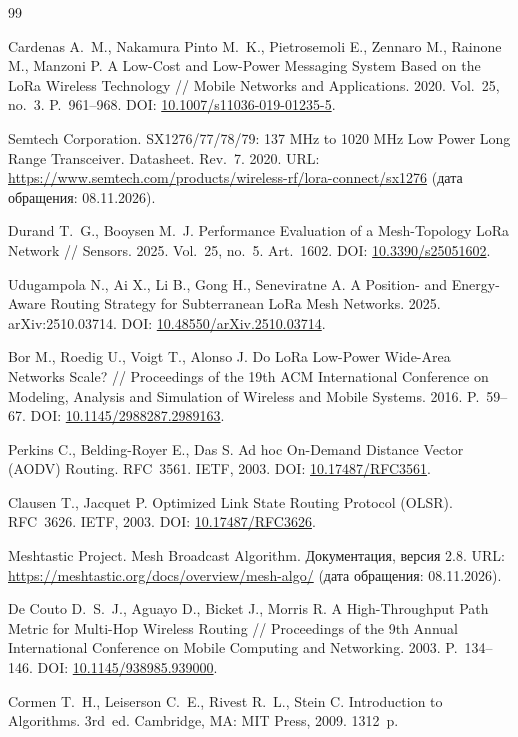 \begin{thebibliography}{99}

Cardenas A.~M., Nakamura Pinto M.~K., Pietrosemoli E., Zennaro M., Rainone M., Manzoni P. A Low-Cost and Low-Power Messaging System Based on the LoRa Wireless Technology // Mobile Networks and Applications. 2020. Vol.~25, no.~3. P.~961--968. DOI: \href{https://doi.org/10.1007/s11036-019-01235-5}{10.1007/s11036-019-01235-5}.

Semtech Corporation. SX1276/77/78/79: 137 MHz to 1020 MHz Low Power Long Range Transceiver. Datasheet. Rev.~7. 2020. URL: \url{https://www.semtech.com/products/wireless-rf/lora-connect/sx1276} (дата обращения: 08.11.2026).

Durand T.~G., Booysen M.~J. Performance Evaluation of a Mesh-Topology LoRa Network // Sensors. 2025. Vol.~25, no.~5. Art.~1602. DOI: \href{https://doi.org/10.3390/s25051602}{10.3390/s25051602}.

Udugampola N., Ai X., Li B., Gong H., Seneviratne A. A Position- and Energy-Aware Routing Strategy for Subterranean LoRa Mesh Networks. 2025. arXiv:2510.03714. DOI: \href{https://doi.org/10.48550/arXiv.2510.03714}{10.48550/arXiv.2510.03714}.

Bor M., Roedig U., Voigt T., Alonso J. Do LoRa Low-Power Wide-Area Networks Scale? // Proceedings of the 19th ACM International Conference on Modeling, Analysis and Simulation of Wireless and Mobile Systems. 2016. P.~59--67. DOI: \href{https://doi.org/10.1145/2988287.2989163}{10.1145/2988287.2989163}.

Perkins C., Belding-Royer E., Das S. Ad hoc On-Demand Distance Vector (AODV) Routing. RFC~3561. IETF, 2003. DOI: \href{https://doi.org/10.17487/RFC3561}{10.17487/RFC3561}.

Clausen T., Jacquet P. Optimized Link State Routing Protocol (OLSR). RFC~3626. IETF, 2003. DOI: \href{https://doi.org/10.17487/RFC3626}{10.17487/RFC3626}.

Meshtastic Project. Mesh Broadcast Algorithm. Документация, версия 2.8. URL: \url{https://meshtastic.org/docs/overview/mesh-algo/} (дата обращения: 08.11.2026).

De Couto D.~S.~J., Aguayo D., Bicket J., Morris R. A High-Throughput Path Metric for Multi-Hop Wireless Routing // Proceedings of the 9th Annual International Conference on Mobile Computing and Networking. 2003. P.~134--146. DOI: \href{https://doi.org/10.1145/938985.939000}{10.1145/938985.939000}.

Cormen T.~H., Leiserson C.~E., Rivest R.~L., Stein C. Introduction to Algorithms. 3rd~ed. Cambridge, MA: MIT Press, 2009. 1312~p.

\end{thebibliography}
